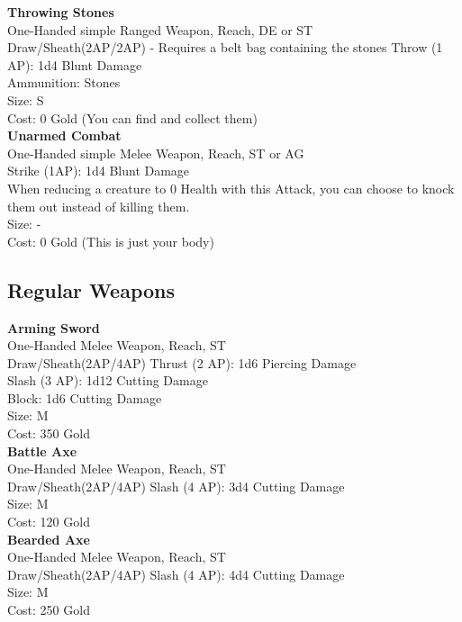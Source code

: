 \textbf{Throwing Stones}\label{weapon:throwingStones}\\
One-Handed simple Ranged Weapon,  Reach, DE or ST\\
Draw/Sheath(2AP/2AP) - Requires a belt bag containing the stones
Throw (1 AP): 1d4 Blunt Damage\\
Ammunition: Stones\\
Size: S\\
Cost: 0 Gold (You can find and collect them)\\

\textbf{Unarmed Combat}\label{weapon:unarmedCombat}\\
One-Handed simple Melee Weapon,  Reach, ST or AG\\
Strike (1AP): 1d4 Blunt Damage\\
When reducing a creature to 0 Health with this Attack, you can choose to knock them out instead of killing them.\\
Size: -\\
Cost: 0 Gold (This is just your body)\\


\subsection{Regular Weapons}\label{subsec:regularWeapons}
\textbf{Arming Sword}\label{weapon:armingSword}\\
One-Handed Melee Weapon,  Reach, ST\\
Draw/Sheath(2AP/4AP)
Thrust (2 AP): 1d6 Piercing Damage\\
Slash (3 AP): 1d12 Cutting Damage\\
Block: 1d6 Cutting Damage\\
Size: M\\
Cost: 350 Gold\\

\textbf{Battle Axe}\label{weapon:battleAxe}\\
One-Handed Melee Weapon,  Reach, ST\\
Draw/Sheath(2AP/4AP)
Slash (4 AP): 3d4 Cutting Damage\\
Size: M\\
Cost: 120 Gold\\

\textbf{Bearded Axe}\label{weapon:beardedAxe}\\
One-Handed Melee Weapon,  Reach, ST\\
Draw/Sheath(2AP/4AP)
Slash (4 AP): 4d4 Cutting Damage\\
Size: M\\
Cost: 250 Gold\\

